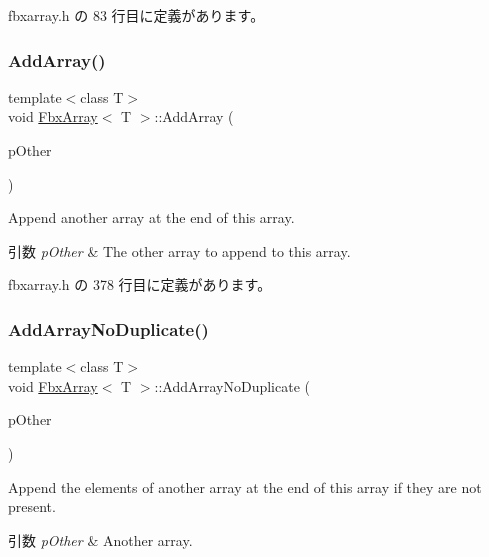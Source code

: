  fbxarray.\+h の 83 行目に定義があります。

\mbox{\label{class_fbx_array_a741247b39ad378a6fbdae4377c718461}} 
\subsubsection{\texorpdfstring{Add\+Array()}{AddArray()}}
{\footnotesize\ttfamily template$<$class T$>$ \\
void \hyperlink{class_fbx_array}{Fbx\+Array}$<$ T $>$\+::Add\+Array (\begin{DoxyParamCaption}\item[{const \hyperlink{class_fbx_array}{Fbx\+Array}$<$ T $>$ \&}]{p\+Other }\end{DoxyParamCaption})\hspace{0.3cm}{\ttfamily [inline]}}

Append another array at the end of this array. 
\begin{DoxyParams}{引数}
{\em p\+Other} & The other array to append to this array. \\
\hline
\end{DoxyParams}


 fbxarray.\+h の 378 行目に定義があります。

\mbox{\label{class_fbx_array_a12a12c9c36c424bd880ae0f716d5efe7}} 
\subsubsection{\texorpdfstring{Add\+Array\+No\+Duplicate()}{AddArrayNoDuplicate()}}
{\footnotesize\ttfamily template$<$class T$>$ \\
void \hyperlink{class_fbx_array}{Fbx\+Array}$<$ T $>$\+::Add\+Array\+No\+Duplicate (\begin{DoxyParamCaption}\item[{const \hyperlink{class_fbx_array}{Fbx\+Array}$<$ T $>$ \&}]{p\+Other }\end{DoxyParamCaption})\hspace{0.3cm}{\ttfamily [inline]}}

Append the elements of another array at the end of this array if they are not present. 
\begin{DoxyParams}{引数}
{\em p\+Other} & Another array. \\
\hline
\end{DoxyParams}


